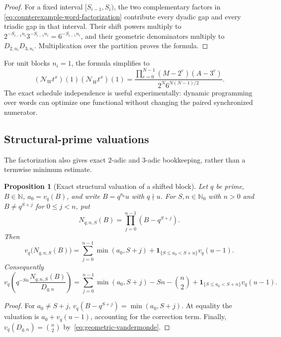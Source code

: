 \documentclass[11pt,oneside]{article}
\newtheorem{proposition}[theorem]{Proposition}
\theoremstyle{definition}
\theoremstyle{remark}
\newcommand{\N}{\mathbb N}
\newcommand{\Nzero}{\mathbb N_0}
\begin{document}
\begin{proof}
For a fixed interval $[S_{i-1},S_i)$, the two complementary factors in
\eqref{eq:counterexample-word-factorization} contribute every dyadic gap and every triadic
gap in that interval.  Their shift powers multiply to
$2^{-S_{i-1}n_i}3^{-S_{i-1}n_i}=6^{-S_{i-1}n_i}$, and their geometric denominators multiply
to $D_{2,n_i}D_{3,n_i}$.  Multiplication over the partition proves the formula.
\end{proof}

For unit blocks $n_i=1$, the formula simplifies to
\begin{equation}
 (\mathcal N_Wt^x)(1)(\mathcal N_{\overline W}t^x)(1)
 =
 \frac{\displaystyle\prod_{e=0}^{N-1}(M-2^e)(A-3^e)}
 {2^N6^{N(N-1)/2}}.
 \label{eq:unit-complement-product}
\end{equation}
The exact schedule independence is useful experimentally: dynamic programming over words can
optimize one functional without changing the paired synchronized numerator.

\subsection{Structural-prime valuations}

The factorization also gives exact $2$-adic and $3$-adic bookkeeping, rather than a termwise
minimum estimate.

\begin{proposition}[Exact structural valuation of a shifted block]
\label{prop:structural-valuation}
Let $q$ be prime, $B\in\N$, $a_0=v_q(B)$, and write $B=q^{a_0}u$ with $q\nmid u$.
For $S,n\in\Nzero$ with $n>0$ and $B\ne q^{S+j}$ for $0\le j<n$, put
\[
 N_{q,n,S}(B)=\prod_{j=0}^{n-1}(B-q^{S+j}).
\]
Then
\begin{equation}
 v_q\bigl(N_{q,n,S}(B)\bigr)
 =\sum_{j=0}^{n-1}\min(a_0,S+j)
 +\mathbf 1_{\{S\le a_0<S+n\}}v_q(u-1).
 \label{eq:exact-numerator-qvaluation}
\end{equation}
Consequently
\begin{equation}
 v_q\!\left(
 q^{-Sn}\frac{N_{q,n,S}(B)}{D_{q,n}}
 \right)
 =\sum_{j=0}^{n-1}\min(a_0,S+j)-Sn-\binom n2
 +\mathbf 1_{\{S\le a_0<S+n\}}v_q(u-1).
 \label{eq:exact-block-qvaluation}
\end{equation}
\end{proposition}

\begin{proof}
For $a_0\ne S+j$,
$v_q(B-q^{S+j})=\min(a_0,S+j)$.  At equality the valuation is
$a_0+v_q(u-1)$, accounting for the correction term.  Finally,
$v_q(D_{q,n})=\binom n2$ by~\eqref{eq:geometric-vandermonde}.
\end{proof}
\end{document}
